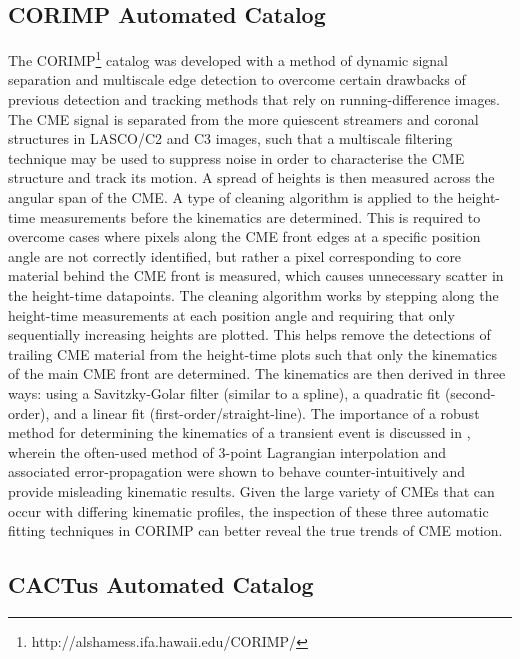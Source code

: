 \documentclass[referee,a4paper,12pt,traditabstract]{swsc}
\begin{document}
\begin{linenumbers}
\subsection{CORIMP Automated Catalog}
\label{sect_corimp}

The CORIMP\footnote{http://alshamess.ifa.hawaii.edu/CORIMP/} catalog was developed with a method of dynamic signal separation and multiscale edge detection to overcome certain drawbacks of previous detection and tracking methods that rely on running-difference images. The CME signal is separated from the more quiescent streamers and coronal structures in LASCO/C2 and C3 images, such that a multiscale filtering technique may be used to suppress noise in order to characterise the CME structure and track its motion. A spread of heights is then measured across the angular span of the CME. A type of cleaning algorithm is applied to the height-time measurements before the kinematics are determined. This is required to overcome cases where pixels along the CME front edges at a specific position angle are not correctly identified, but rather a pixel corresponding to core material behind the CME front is measured, which causes unnecessary scatter in the height-time datapoints. The cleaning algorithm works by stepping along the height-time measurements at each position angle and requiring that only sequentially increasing heights are plotted. This helps remove the detections of trailing CME material from the height-time plots such that only the kinematics of the main CME front are determined. The kinematics are then derived in three ways: using a Savitzky-Golar filter (similar to a spline), a quadratic fit (second-order), and a linear fit (first-order/straight-line). The importance of a robust method for determining the kinematics of a transient event is discussed in \cite{2013A&A...557A..96B}, wherein the often-used method of 3-point Lagrangian interpolation and associated error-propagation were shown to behave counter-intuitively and provide misleading kinematic results. Given the large variety of CMEs that can occur with differing kinematic profiles, the inspection of these three automatic fitting techniques in CORIMP can better reveal the true trends of CME motion.


\subsection{CACTus Automated Catalog}


\end{linenumbers}
\end{document}
